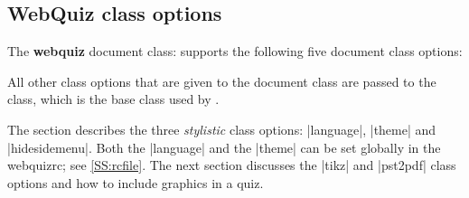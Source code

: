 \documentclass[svgnames]{article}
\newcommand\webquizrc{\index{webquizrc}\textsf{webquizrc}\xspace}
\begin{document}
\subsection{WebQuiz class options}
\label{SS:classOptions}

The \textbf{webquiz} document class: supports the following
five document class options:


    All other class options that are given to the \WebQuiz document class
    are passed to the  class, which is the base class used
    by .

    The section describes the three \textit{stylistic} class options:
    \LatexCode|language|, \LatexCode|theme| and \LatexCode|hidesidemenu|.
    Both the \LatexCode|language| and the \LatexCode|theme| can be set globally in
    the \webquizrc; see \autoref{SS:rcfile}.
    The next section discusses the \LatexCode|tikz| and \LatexCode|pst2pdf| class
    options and how to include graphics in a quiz.
\end{document}
